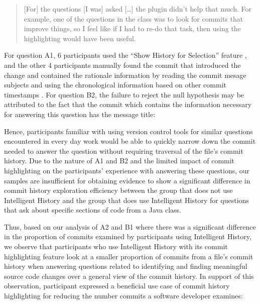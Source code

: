 \begin{quote}
  [For] the questions [I was] asked [\dots] the plugin didn’t help that much. 
  For example, one of the questions in the  class was to look for commits that improve things, 
  so I feel like if I had to re-do that task, then using the highlighting would have been useful.
\end{quote}

For question A1, 6 participants used the ``Show History for Selection'' feature ,
and the other 4 participants manually found the commit that introduced the change and contained the rationale information by reading the commit mesage subjects and using the chronological information based on other commit timestamps .
For question B2, the failure to reject the null hypothesis may be attributed to the fact that the commit  which contains the information necessary for answering this question has the message title: 

\begin{center}
\end{center}

Hence, participants familiar with using version control tools for similar questions encountered 
in every day work would be able to quickly narrow down the commit needed to answer 
the question without requiring traversal of the file's commit history.
Due to the nature of A1 and B2 and the limited impact of commit highlighting 
on the participants' experience with answering these questions,
our samples are insufficient for obtaining evidence to show a significant difference in 
commit history exploration efficiency between the group that does not use Intelligent History 
and the group that does use Intelligent History for questions that ask about specific sections of code from a Java class.

Thus, based on our analysis of A2 and B1 where there was a significant difference in 
the proportion of commits examined by participants using Intelligent History, 
we observe that participants who use Intelligent History with its commit highlighting feature 
look at a smaller proportion of commits from a file's commit history when answering questions related to
identifying and finding meaningful source code changes over a general view of the commit history.
In support of this observation, 
participant  expressed a beneficial use case of commit history highlighting 
for reducing the number commits a software developer examines:

